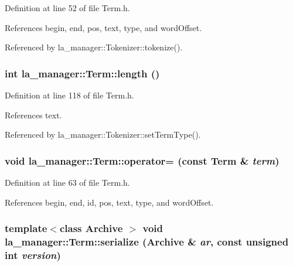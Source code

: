Definition at line 52 of file Term.h.

References begin, end, pos, text, type, and wordOffset.

Referenced by la\_\-manager::Tokenizer::tokenize().\hypertarget{classla__manager_1_1Term_fadc9c8437a99b79102bd8be1f53f337}{
\subsubsection[{length}]{\setlength{\rightskip}{0pt plus 5cm}int la\_\-manager::Term::length ()}}
\label{classla__manager_1_1Term_fadc9c8437a99b79102bd8be1f53f337}




Definition at line 118 of file Term.h.

References text.

Referenced by la\_\-manager::Tokenizer::setTermType().\hypertarget{classla__manager_1_1Term_6d2214c0b4855630660b34cf293ce333}{
\subsubsection[{operator=}]{\setlength{\rightskip}{0pt plus 5cm}void la\_\-manager::Term::operator= (const {\bf Term} \& {\em term})}}
\label{classla__manager_1_1Term_6d2214c0b4855630660b34cf293ce333}




Definition at line 63 of file Term.h.

References begin, end, id, pos, text, type, and wordOffset.\hypertarget{classla__manager_1_1Term_48b8e8e2c1aefacb9bdd5a026275df34}{
\subsubsection[{serialize}]{\setlength{\rightskip}{0pt plus 5cm}template$<$class Archive $>$ void la\_\-manager::Term::serialize (Archive \& {\em ar}, \/  const unsigned int {\em version})}}
\label{classla__manager_1_1Term_48b8e8e2c1aefacb9bdd5a026275df34}




